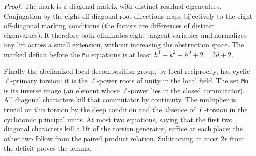 \begin{proof}
The mark is a diagonal matrix with distinct residual
eigenvalues. Conjugation by the eight off-diagonal root
directions maps bijectively to the eight off-diagonal
marking conditions (the factors are differences of distinct
eigenvalues). It therefore both eliminates eight tangent
variables and normalizes any lift across a small extension,
without increasing the obstruction space. The marked
deficit before the \texttt{Mu} equations is at least
$h^1-h^2-h^0+2=2d+2$.

Finally the abelianized local decomposition group, by local
reciprocity, has cyclic $\ell$-primary torsion: it is the
$\ell$-power roots of unity in the local field. The set
\texttt{Mu} is its inverse image (an element whose
$\ell$-power lies in the closed commutator). All diagonal
characters kill that commutator by continuity. The
multiplier is trivial on this torsion by the deep condition
and the absence of $\ell$-torsion in the cyclotomic
principal units. At most two equations, saying that the
first two diagonal characters kill a lift of the torsion
generator, suffice at each place; the other two follow
from the paired product relation. Subtracting at most $2r$
from the deficit proves the lemma.
\end{proof}

